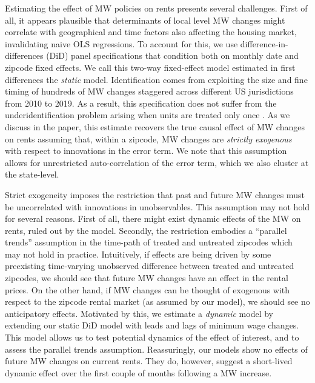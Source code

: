 Estimating the effect of MW policies on rents presents several challenges. First of all, it 
appears plausible that determinants of local level MW changes might correlate with 
geographical and time factors also affecting the housing market, invalidating naive OLS 
regressions. To account for this, we use difference-in-differences (DiD) panel specifications 
that condition both on monthly date and zipcode fixed effects. We call this two-way 
fixed-effect model estimated in first differences the \textit{static} model. Identification 
comes from exploiting the size and fine timing of hundreds of MW changes staggered across 
different US jurisdictions from 2010 to 2019. As a result, this specification does not 
suffer from the underidentification problem arising when units are treated only once 
\parencite{BorusyakJaravel2017}. As we discuss in the paper, this estimate recovers the true 
causal effect of MW changes on rents assuming that, within a zipcode, MW changes are 
\textit{strictly exogenous} with respect to innovations in the error term. We note that 
this assumption allows for unrestricted auto-correlation of the error term, which we also 
cluster at the state-level.

Strict exogeneity imposes the restriction that past and future MW changes must be uncorrelated 
with innovations in unobservables. This assumption may not hold for several reasons. First of 
all, there might exist dynamic effects of the MW on rents, ruled out by the model. Secondly, 
the restriction embodies a ``parallel trends'' assumption in the time-path of treated and 
untreated zipcodes which may not hold in practice. Intuitively, if effects are being driven 
by some preexisting time-varying unobserved difference between treated and untreated zipcodes, 
we should see that future MW changes have an effect in the rental prices. On the other hand, 
if MW changes can be thought of exogenous with respect to the zipcode rental market (as 
assumed by our model), we should see no anticipatory effects. Motivated by this, we estimate 
a \textit{dynamic} model by extending our static DiD model with leads and lags of minimum 
wage changes. This model allows us to test potential dynamics of the effect of interest, and 
to assess the parallel trends assumption. Reassuringly, our models show no effects of future 
MW changes on current rents. They do, however, suggest a short-lived dynamic effect over the 
first couple of months following a MW increase.

